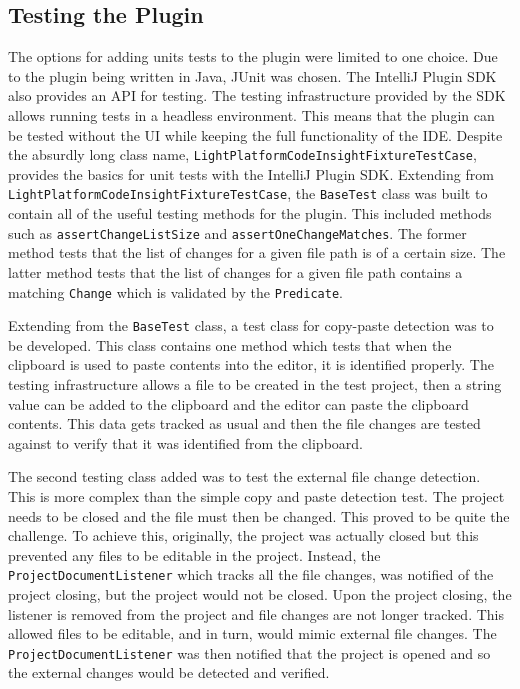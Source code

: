 \subsection{Testing the Plugin}
The options for adding units tests to the plugin were limited to one choice. Due to the plugin being written in Java, JUnit was chosen. The IntelliJ Plugin SDK also provides an API for testing. The testing infrastructure provided by the SDK allows running tests in a headless environment. This means that the plugin can be tested without the UI while keeping the full functionality of the IDE. Despite the absurdly long class name, \texttt{LightPlatformCodeInsightFixtureTestCase}, provides the basics for unit tests with the IntelliJ Plugin SDK. Extending from \texttt{LightPlatformCodeInsightFixtureTestCase}, the \texttt{BaseTest} class was built to contain all of the useful testing methods for the plugin. This included methods such as \texttt{assertChangeListSize} and \texttt{assertOneChangeMatches}. The former method tests that the list of changes for a given file path is of a certain size. The latter method tests that the list of changes for a given file path contains a matching \texttt{Change} which is validated by the \texttt{Predicate}.

Extending from the \texttt{BaseTest} class, a test class for copy-paste detection was to be developed. This class contains one method which tests that when the clipboard is used to paste contents into the editor, it is identified properly. The testing infrastructure allows a file to be created in the test project, then a string value can be added to the clipboard and the editor can paste the clipboard contents. This data gets tracked as usual and then the file changes are tested against to verify that it was identified from the clipboard.

The second testing class added was to test the external file change detection. This is more complex than the simple copy and paste detection test. The project needs to be closed and the file must then be changed. This proved to be quite the challenge. To achieve this, originally, the project was actually closed but this prevented any files to be editable in the project. Instead, the \texttt{ProjectDocumentListener} which tracks all the file changes, was notified of the project closing, but the project would not be closed. Upon the project closing, the listener is removed from the project and file changes are not longer tracked. This allowed files to be editable, and in turn, would mimic external file changes. The \texttt{ProjectDocumentListener} was then notified that the project is opened and so the external changes would be detected and verified.

